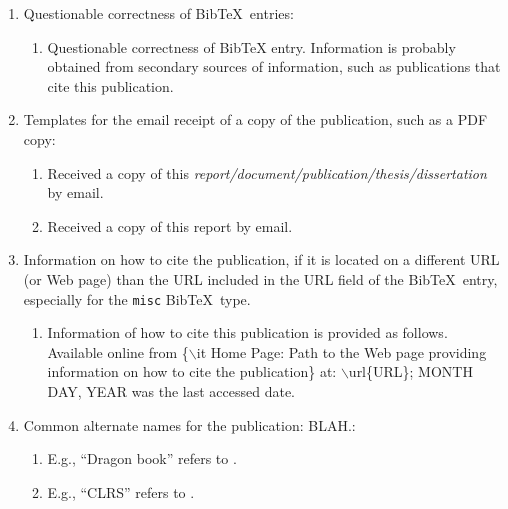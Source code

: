 \documentclass[letter,12pt]{article}
\begin{document}
\begin{enumerate}
\begin{enumerate}
	\end{enumerate}
\item Questionable correctness of {\sc Bib}\TeX\ entries: \vspace{-0.3cm}
	\begin{enumerate} \itemsep -2pt
	\item Questionable correctness of BibTeX entry. Information is probably obtained from secondary sources of information, such as publications that cite this publication.
	\end{enumerate}
\item Templates for the email receipt of a copy of the publication, such as a PDF copy: \vspace{-0.3cm}
	\begin{enumerate} \itemsep -2pt
	\item Received a copy of this {\it report/document/publication/thesis/dissertation} by email.
	\item Received a copy of this report by email.
	\end{enumerate}
\item Information on how to cite the publication, if it is located on a different URL (or Web page) than the URL included in the URL field of the {\sc Bib}\TeX\ entry, especially for the {\tt misc} {\sc Bib}\TeX\ type. \vspace{-0.3cm}
	\begin{enumerate} \itemsep -2pt
	\item Information of how to cite this publication is provided as follows. Available online from \{$\backslash$it Home Page: Path to the Web page providing information on how to cite the publication\} at: $\backslash$url\{URL\}; MONTH DAY, YEAR was the last accessed date.
	\end{enumerate}
\item Common alternate names for the publication: BLAH.: \vspace{-0.3cm}
	\begin{enumerate} \itemsep -2pt
	\item E.g., ``Dragon book'' \cite{WikipediaContributors2021f} refers to \cite{Aho2007,Aho1986}.
	\item E.g., ``CLRS'' \cite{WikipediaContributors2022d} refers to \cite{Cormen2022,Cormen2009,Cormen2001}.
	\end{enumerate}
\end{enumerate}
\end{document}
